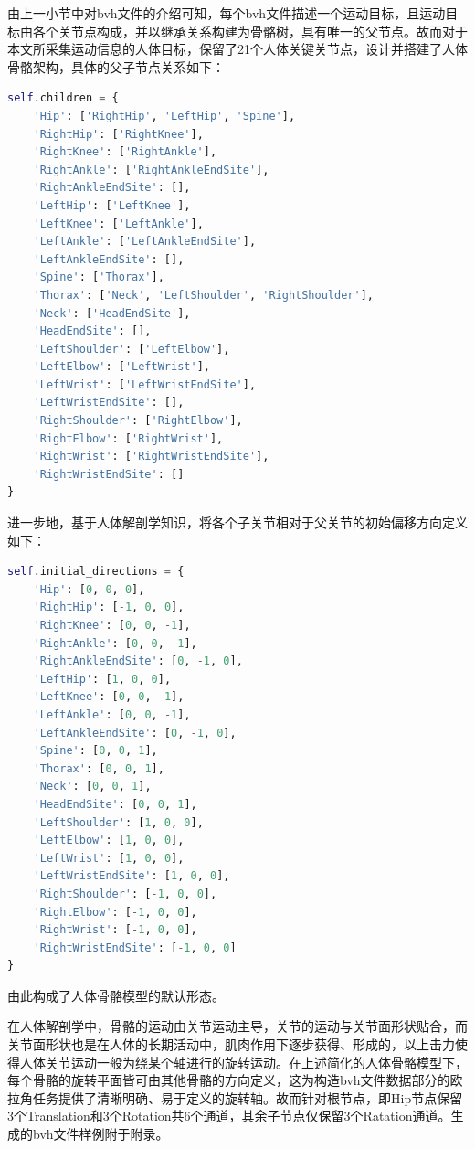 由上一小节中对bvh文件的介绍可知，每个bvh文件描述一个运动目标，且运动目标由各个关节点构成，并以继承关系构建为骨骼树，具有唯一的父节点。故而对于本文所采集运动信息的人体目标，保留了21个人体关键关节点，设计并搭建了人体骨骼架构，具体的父子节点关系如下：

\begin{lstlisting}[language=python, label={lst:children}]
 self.children = {
    'Hip': ['RightHip', 'LeftHip', 'Spine'],
    'RightHip': ['RightKnee'],
    'RightKnee': ['RightAnkle'],
    'RightAnkle': ['RightAnkleEndSite'],
    'RightAnkleEndSite': [],
    'LeftHip': ['LeftKnee'],
    'LeftKnee': ['LeftAnkle'],
    'LeftAnkle': ['LeftAnkleEndSite'],
    'LeftAnkleEndSite': [],
    'Spine': ['Thorax'],
    'Thorax': ['Neck', 'LeftShoulder', 'RightShoulder'],
    'Neck': ['HeadEndSite'],
    'HeadEndSite': [],
    'LeftShoulder': ['LeftElbow'],
    'LeftElbow': ['LeftWrist'],
    'LeftWrist': ['LeftWristEndSite'],
    'LeftWristEndSite': [],
    'RightShoulder': ['RightElbow'],
    'RightElbow': ['RightWrist'],
    'RightWrist': ['RightWristEndSite'],
    'RightWristEndSite': []
}
\end{lstlisting}

进一步地，基于人体解剖学知识，将各个子关节相对于父关节的初始偏移方向定义如下：

\begin{lstlisting}[language=python, label={lst:direction}]
self.initial_directions = {
    'Hip': [0, 0, 0],
    'RightHip': [-1, 0, 0],
    'RightKnee': [0, 0, -1],
    'RightAnkle': [0, 0, -1],
    'RightAnkleEndSite': [0, -1, 0],
    'LeftHip': [1, 0, 0],
    'LeftKnee': [0, 0, -1],
    'LeftAnkle': [0, 0, -1],
    'LeftAnkleEndSite': [0, -1, 0],
    'Spine': [0, 0, 1],
    'Thorax': [0, 0, 1],
    'Neck': [0, 0, 1],
    'HeadEndSite': [0, 0, 1],
    'LeftShoulder': [1, 0, 0],
    'LeftElbow': [1, 0, 0],
    'LeftWrist': [1, 0, 0],
    'LeftWristEndSite': [1, 0, 0],
    'RightShoulder': [-1, 0, 0],
    'RightElbow': [-1, 0, 0],
    'RightWrist': [-1, 0, 0],
    'RightWristEndSite': [-1, 0, 0]
}
\end{lstlisting}

由此构成了人体骨骼模型的默认形态。

在人体解剖学中，骨骼的运动由关节运动主导，关节的运动与关节面形状贴合，而关节面形状也是在人体的长期活动中，肌肉作用下逐步获得、形成的，以上击力使得人体关节运动一般为绕某个轴进行的旋转运动。在上述简化的人体骨骼模型下，每个骨骼的旋转平面皆可由其他骨骼的方向定义，这为构造bvh文件数据部分的欧拉角任务提供了清晰明确、易于定义的旋转轴。故而针对根节点，即Hip节点保留3个Translation和3个Rotation共6个通道，其余子节点仅保留3个Ratation通道。生成的bvh文件样例附于附录。

